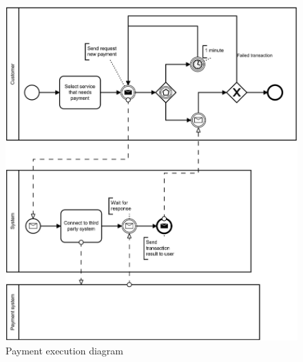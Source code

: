\begin{figure}[!htb]
\centering
\includegraphics[width=1.0\textwidth]{Img/DiagramPayment.jpg}
\caption{Payment execution diagram}
\end{figure}
